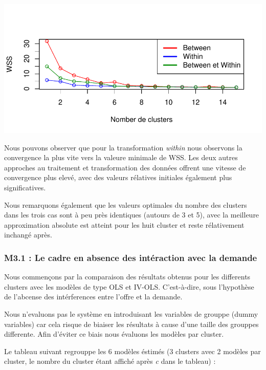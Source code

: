 \documentclass[11pt,]{article}
\begin{document}
\FloatBarrier

\begin{center}\includegraphics{note2pres_files/figure-latex/unnamed-chunk-41-1} \end{center}

\FloatBarrier

Nous pouvons observer que pour la transformation \emph{within} nous
observons la convergence la plus vite vers la valeure minimale de WSS.
Les deux autres approches au traitement et transformation des données
offrent une vitesse de convergence plus elevé, avec des valeurs
rélatives initiales également plus significatives.

Nous remarquons également que les valeurs optimales du nombre des
clusters dans les trois cas sont à peu près identiques (autours de 3 et
5), avec la meilleure approximation absolute est atteint pour les huit
cluster et reste rélativement inchangé après.

\hypertarget{m3.1-le-cadre-en-absence-des-interaction-avec-la-demande}{%
\subsubsection{M3.1 : Le cadre en absence des intéraction avec la
demande}\label{m3.1-le-cadre-en-absence-des-interaction-avec-la-demande}}

Nous commençons par la comparaison des résultats obtenus pour les
differents clusters avec les modèles de type OLS et IV-OLS.
C'est-à-dire, sous l'hypothèse de l'abcense des intérferences entre
l'offre et la demande.

Nous n'evaluons pas le système en introduisant les variables de grouppe
(dummy variables) car cela risque de biaiser les résultats à cause d'une
taille des grouppes differente. Afin d'éviter ce biais nous évaluons les
modèles par cluster.

Le tableau suivant regrouppe les 6 modèles éstimés (3 clusters avec 2
modèles par cluster, le nombre du cluster étant affiché après \emph{c}
dans le tableau) :
\end{document}
